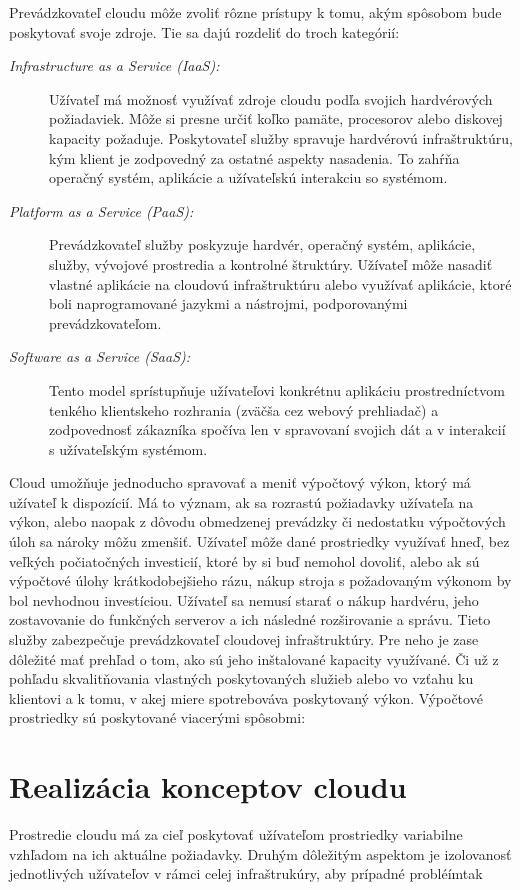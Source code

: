 \documentclass[printed,11pt,twoside,color,cover,table]{fithesis3}
\begin{document}
Prevádzkovateľ cloudu môže zvoliť rôzne prístupy k tomu, akým spôsobom bude poskytovať svoje zdroje. Tie sa dajú rozdeliť do troch kategórií:

\begin{description}
\item[\emph{Infrastructure as a Service (IaaS):}] Užívateľ má možnosť využívať zdroje cloudu podľa svojich hardvérových požiadaviek.
Môže si presne určiť koľko pamäte, procesorov alebo diskovej kapacity požaduje. Poskytovateľ služby spravuje hardvérovú infraštruktúru,
kým klient je zodpovedný za ostatné aspekty nasadenia. To zahŕňa operačný systém, aplikácie a užívateľskú interakciu so systémom. \cite{cloud_bible}
\item[\emph{Platform as a Service (PaaS):}] Prevádzkovateľ služby poskyzuje hardvér, operačný systém, aplikácie, služby, vývojové prostredia
a kontrolné štruktúry. Užívateľ môže nasadiť vlastné aplikácie na cloudovú infraštruktúru alebo využívať aplikácie, ktoré boli naprogramované
jazykmi a nástrojmi, podporovanými prevádzkovateľom. %
\item[\emph{Software as a Service (SaaS):}] Tento model sprístupňuje užívateľovi konkrétnu aplikáciu prostredníctvom tenkého klientskeho 
rozhrania (zväčša cez webový prehliadač) a zodpovednosť zákazníka spočíva len v spravovaní svojich dát a v interakcií s užívateľským systémom.\cite{cloud_bible}
\end{description}

Cloud umožňuje jednoducho spravovať a meniť výpočtový výkon, ktorý má užívateľ k dispozícií. Má to význam, ak sa rozrastú požiadavky užívateľa na výkon, alebo naopak z dôvodu obmedzenej prevádzky či 
nedostatku výpočtových úloh sa nároky môžu zmenšiť. Užívateľ môže dané prostriedky využívať hneď, bez veľkých počiatočných investicií, ktoré by si buď nemohol dovoliť, alebo ak sú výpočtové úlohy krátkodobejšieho rázu, nákup
stroja s požadovaným výkonom by bol nevhodnou investíciou. Užívateľ sa nemusí starať o nákup hardvéru, jeho zostavovanie do funkčných serverov a ich následné rozširovanie a správu. Tieto služby zabezpečuje prevádzkovateľ cloudovej infraštruktúry.
Pre neho je zase dôležité mať prehľad o tom, ako sú jeho inštalované kapacity využívané. Či už z pohľadu skvalitňovania vlastných poskytovaných služieb alebo vo vzťahu ku klientovi a k tomu, v akej miere spotrebováva poskytovaný výkon.
Výpočtové prostriedky sú poskytované viacerými spôsobmi:

\section{Realizácia konceptov cloudu}
Prostredie cloudu má za cieľ poskytovať užívateľom prostriedky variabilne vzhľadom na ich aktuálne požiadavky. Druhým dôležitým aspektom je
izolovanosť jednotlivých užívateľov v rámci celej infraštrukúry, aby prípadné probléímtak
\end{document}
